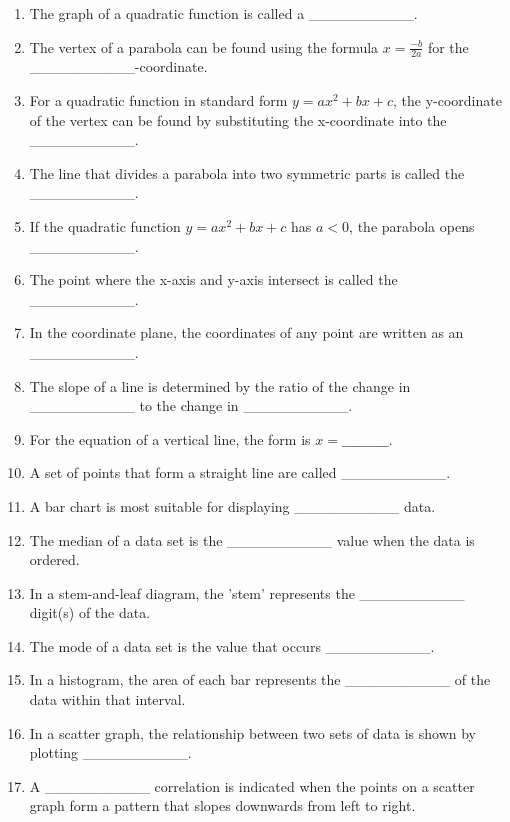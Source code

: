 \documentclass{article}
\begin{document}
\begin{enumerate}
    \item The graph of a quadratic function is called a \_\_\_\_\_\_\_\_\_\_.
    \item The vertex of a parabola can be found using the formula \( x = \frac{-b}{2a} \) for the \_\_\_\_\_\_\_\_\_\_-coordinate.
    \item For a quadratic function in standard form \( y = ax^2 + bx + c \), the y-coordinate of the vertex can be found by substituting the x-coordinate into the \_\_\_\_\_\_\_\_\_\_.
    \item The line that divides a parabola into two symmetric parts is called the \_\_\_\_\_\_\_\_\_\_.
    \item If the quadratic function \( y = ax^2 + bx + c \) has \( a < 0 \), the parabola opens \_\_\_\_\_\_\_\_\_\_.
    \item The point where the x-axis and y-axis intersect is called the \_\_\_\_\_\_\_\_\_\_.
    \item In the coordinate plane, the coordinates of any point are written as an \_\_\_\_\_\_\_\_\_\_.
    \item The slope of a line is determined by the ratio of the change in \_\_\_\_\_\_\_\_\_\_ to the change in \_\_\_\_\_\_\_\_\_\_.
    \item For the equation of a vertical line, the form is \( x = \_\_\_\_\_\_\_\_\_\_ \).
    \item A set of points that form a straight line are called \_\_\_\_\_\_\_\_\_\_.
    \item A bar chart is most suitable for displaying \_\_\_\_\_\_\_\_\_\_ data.
    \item The median of a data set is the \_\_\_\_\_\_\_\_\_\_ value when the data is ordered.
    \item In a stem-and-leaf diagram, the 'stem' represents the \_\_\_\_\_\_\_\_\_\_ digit(s) of the data.
    \item The mode of a data set is the value that occurs \_\_\_\_\_\_\_\_\_\_.
    \item In a histogram, the area of each bar represents the \_\_\_\_\_\_\_\_\_\_ of the data within that interval.
    \item In a scatter graph, the relationship between two sets of data is shown by plotting \_\_\_\_\_\_\_\_\_\_.
    \item A \_\_\_\_\_\_\_\_\_\_ correlation is indicated when the points on a scatter graph form a pattern that slopes downwards from left to right.

\end{enumerate}
\end{document}

